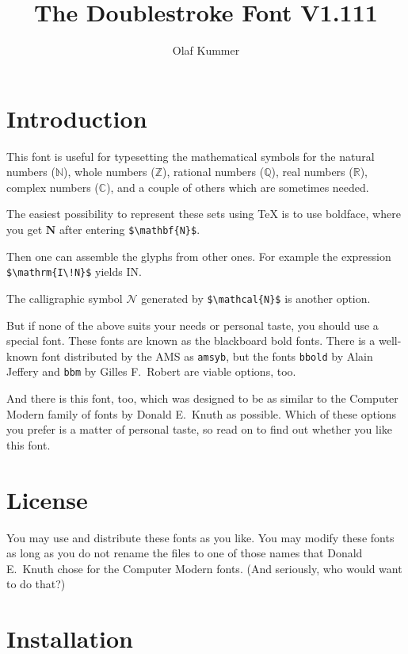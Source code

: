 \documentclass[a4paper]{article}
\begin{document}
\title{\bf The Doublestroke Font V1.111}

\author{Olaf Kummer}

\maketitle

\section{Introduction}

This font is useful for typesetting the mathematical
symbols for the natural numbers ($\mathds{N}$),
whole numbers ($\mathds{Z}$), rational numbers ($\mathds{Q}$), 
real numbers ($\mathds{R}$), complex numbers ($\mathds{C}$),
and a couple of others which are sometimes needed.

The easiest possibility to represent these sets using
\TeX{} is to use boldface, where you get $\mathbf{N}$
after entering \verb:$\mathbf{N}$:.

Then one can assemble the glyphs from
other ones. For example the expression \verb:$\mathrm{I\!N}$: 
yields $\mathrm{I\!N}$.

The calligraphic symbol $\mathcal{N}$ generated by
\verb:$\mathcal{N}$: is another option.

But if none of the above suits your needs or
personal taste, you should use a special font. These fonts
are known as the blackboard bold fonts. There is a
well-known font distributed by the AMS as
\texttt{amsyb}, but the fonts
\texttt{bbold} by Alain Jeffery and \texttt{bbm} by
Gilles F.~Robert are viable options, too.

And there is this font, too, which was designed
to be as similar to the Computer Modern family of fonts
by Donald E.~Knuth as possible. Which of these options you
prefer is a matter of personal taste, so read on to find
out whether you like this font.


\section{License}

You may use and distribute these fonts as you like.
You may modify these fonts as long as you do not
rename the files to one of those names that 
Donald E.~Knuth chose for the Computer Modern fonts.
(And seriously, who would want to do that?)


\section{Installation}
\end{document}

